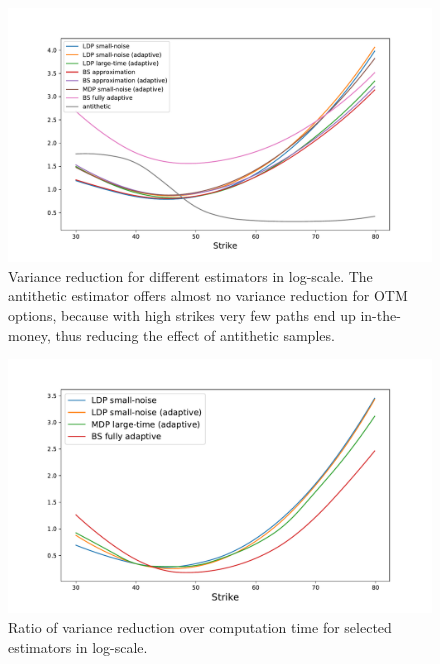 \begin{figure}[htbp]
    \centering
    \includegraphics[scale=0.5]{content/reschap3/Figures/HESTON/compare-all-new.pdf}
    \caption{Variance reduction for different estimators in log-scale. 
    The antithetic estimator offers almost no variance reduction for OTM options, because with high strikes very few paths end up in-the-money, thus reducing the effect of antithetic samples.}\label{ref:OverallVarRedu}
\end{figure}

\begin{figure}[htbp]
    \centering
    \includegraphics[scale=0.5]{content/reschap3/Figures/HESTON/compare-perf-new.pdf}
    \caption{Ratio of variance reduction over computation time for selected estimators in log-scale.}\label{ref:OverallVarComp}
\end{figure}

